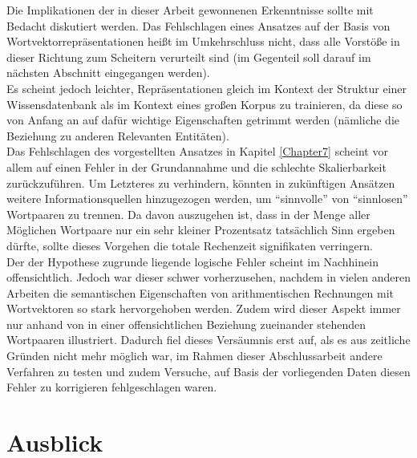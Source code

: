 Die Implikationen der in dieser Arbeit gewonnenen Erkenntnisse sollte mit Bedacht diskutiert werden. Das Fehlschlagen
eines Ansatzes auf der Basis von Wortvektorrepräsentationen heißt im Umkehrschluss nicht, dass alle Vorstöße in dieser
Richtung zum Scheitern verurteilt sind (im Gegenteil soll darauf im nächsten Abschnitt eingegangen werden).\\
Es scheint jedoch leichter, Repräsentationen gleich im Kontext der Struktur einer Wissensdatenbank als im
Kontext eines großen Korpus zu trainieren, da diese so von Anfang an auf dafür wichtige Eigenschaften getrimmt werden
(nämliche die Beziehung zu anderen Relevanten Entitäten).\\

Das Fehlschlagen des vorgestellten Ansatzes in Kapitel \ref{Chapter7} scheint vor allem auf einen Fehler in der
Grundannahme und die schlechte Skalierbarkeit zurückzuführen. Um Letzteres zu verhindern, könnten in zukünftigen Ansätzen
weitere Informationsquellen hinzugezogen werden, um ``sinnvolle'' von ``sinnlosen'' Wortpaaren zu trennen. Da davon
auszugehen ist, dass in der Menge aller Möglichen Wortpaare nur ein sehr kleiner Prozentsatz tatsächlich Sinn ergeben
dürfte, sollte dieses Vorgehen die totale Rechenzeit signifikaten verringern.\\
Der der Hypothese zugrunde liegende logische Fehler scheint im Nachhinein offensichtlich. Jedoch war dieser schwer
vorherzusehen, nachdem in vielen anderen Arbeiten die semantischen Eigenschaften von arithmentischen Rechnungen mit
Wortvektoren so stark hervorgehoben werden. Zudem wird dieser Aspekt immer nur anhand von in einer offensichtlichen
Beziehung zueinander stehenden Wortpaaren illustriert. Dadurch fiel dieses Versäumnis erst auf, als es aus zeitliche Gründen
nicht mehr möglich war, im Rahmen dieser Abschlussarbeit andere Verfahren zu testen und zudem Versuche, auf Basis der
vorliegenden Daten diesen Fehler zu korrigieren fehlgeschlagen waren.

\section{Ausblick}
